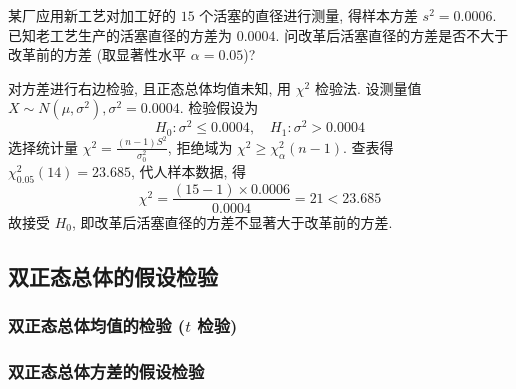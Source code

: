 \begin{example}
    某厂应用新工艺对加工好的 $15 $ 个活塞的直径进行测量, 得样本方差 $ s^{2}=  0.0006$. 
    已知老工艺生产的活塞直径的方差为 $0.0004$. 问改革后活塞直径的方差是否不大于改革前的方差 (取显著性水平 $ \alpha=0.05$)?
\end{example}
\begin{solution}
    对方差进行右边检验, 且正态总体均值未知, 用 $ \chi^{2} $ 检验法. 
    设测量值 $ X \sim N\left(\mu, \sigma^{2}\right), \sigma^{2}=0.0004 $.
    检验假设为
    $$H_{0}: \sigma^{2} \leqslant 0.0004, \quad H_{1}: \sigma^{2}>0.0004 $$
    选择统计量 $\displaystyle \chi^{2}=\frac{(n-1) S^{2}}{\sigma_{0}^{2}} $, 拒绝域为 $ \chi^{2} \geqslant \chi_{\alpha}^{2}(n-1) $. 
    查表得 $ \chi_{0.05}^{2}(14)=23.685$, 代人样本数据, 得 $$\displaystyle \chi^{2}=\frac{(15-1) \times 0.0006}{0.0004}=21<23.685 $$ 
    故接受 $ H_{0} $, 即改革后活塞直径的方差不显著大于改革前的方差.
\end{solution}

\subsection{双正态总体的假设检验}


\subsubsection{双正态总体均值的检验 (\texorpdfstring{$t$}. 检验)}

\subsubsection{双正态总体方差的假设检验}

